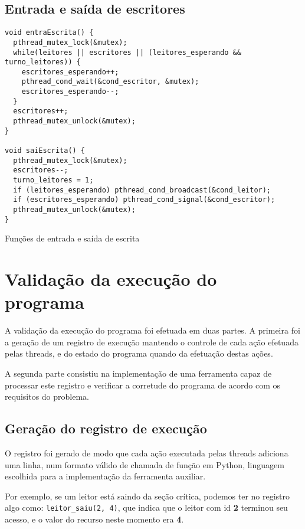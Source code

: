 \documentclass[11pt]{article}
\begin{document}
\newpage

\subsection{Entrada e saída de escritores}
\label{sec:org96f8a54}
\begin{listing}[htbp]
\begin{verbatim}
void entraEscrita() {
  pthread_mutex_lock(&mutex);
  while(leitores || escritores || (leitores_esperando && turno_leitores)) {
    escritores_esperando++;
    pthread_cond_wait(&cond_escritor, &mutex);
    escritores_esperando--;
  }
  escritores++;
  pthread_mutex_unlock(&mutex);
}

void saiEscrita() {
  pthread_mutex_lock(&mutex);
  escritores--;
  turno_leitores = 1;
  if (leitores_esperando) pthread_cond_broadcast(&cond_leitor);
  if (escritores_esperando) pthread_cond_signal(&cond_escritor);
  pthread_mutex_unlock(&mutex);
}
\end{verbatim}
\caption{\label{Escritores}
Funções de entrada e saída de escrita}
\end{listing}

\section{Validação da execução do programa}
\label{sec:orgfd66e47}
A validação da execução do programa foi efetuada em duas partes. A primeira foi a geração
de um registro de execução mantendo o controle de cada ação efetuada pelas threads, e do
estado do programa quando da efetuação destas ações.

A segunda parte consistiu na implementação de uma ferramenta capaz de processar este registro
e verificar a corretude do programa de acordo com os requisitos do problema.

\subsection{Geração do registro de execução}
\label{sec:org6fa02e0}
O registro foi gerado de modo que cada ação executada pelas threads adiciona uma linha,
num formato válido de chamada de função em Python, linguagem escolhida para a implementação
da ferramenta auxiliar.

Por exemplo, se um leitor está saindo da seção crítica, podemos ter no registro algo como:
\texttt{leitor\_saiu(2, 4)}, que indica que o leitor com id \textbf{2} terminou seu acesso, e o valor
do recurso neste momento era \textbf{4}.
\end{document}
